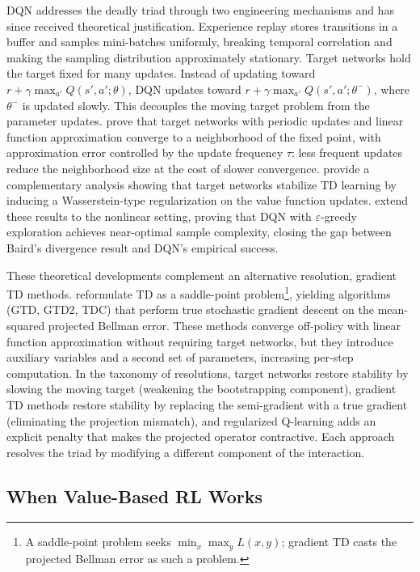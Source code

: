 DQN \citep{mnih2015} addresses the deadly triad through two engineering mechanisms and has since received theoretical justification. Experience replay stores transitions in a buffer and samples mini-batches uniformly, breaking temporal correlation and making the sampling distribution approximately stationary. Target networks hold the target fixed for many updates. Instead of updating toward $r + \gamma \max_{a'} Q(s', a'; \theta)$, DQN updates toward $r + \gamma \max_{a'} Q(s', a'; \theta^-)$, where $\theta^-$ is updated slowly. This decouples the moving target problem from the parameter updates. \citet{zhang2021target} prove that target networks with periodic updates and linear function approximation converge to a neighborhood of the fixed point, with approximation error controlled by the update frequency $\tau$: less frequent updates reduce the neighborhood size at the cost of slower convergence. \citet{Fellows2023} provide a complementary analysis showing that target networks stabilize TD learning by inducing a Wasserstein-type regularization on the value function updates. \citet{Zhang2023} extend these results to the nonlinear setting, proving that DQN with $\varepsilon$-greedy exploration achieves near-optimal sample complexity, closing the gap between Baird's divergence result and DQN's empirical success.

These theoretical developments complement an alternative resolution, gradient TD methods. \citet{sutton2009gtd} reformulate TD as a saddle-point problem\footnote{A saddle-point problem seeks $\min_x \max_y L(x,y)$; gradient TD casts the projected Bellman error as such a problem.}, yielding algorithms (GTD, GTD2, TDC) that perform true stochastic gradient descent on the mean-squared projected Bellman error. These methods converge off-policy with linear function approximation without requiring target networks, but they introduce auxiliary variables and a second set of parameters, increasing per-step computation. In the taxonomy of resolutions, target networks restore stability by slowing the moving target (weakening the bootstrapping component), gradient TD methods restore stability by replacing the semi-gradient with a true gradient (eliminating the projection mismatch), and regularized Q-learning \citep{lim2024regularized} adds an explicit penalty that makes the projected operator contractive. Each approach resolves the triad by modifying a different component of the interaction.


\subsection{When Value-Based RL Works}
\label{sec:when_value_works}

